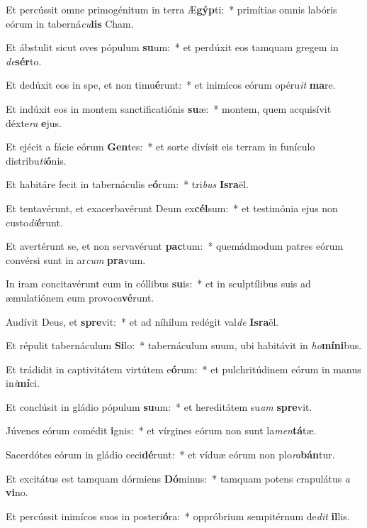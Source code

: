 \item Et percússit omne primogénitum in terra Æ\textbf{gýp}ti:~* primítias omnis labóris eórum in taberná\textit{cu}\textbf{lis} Cham.
\item Et ábstulit sicut oves pópulum \textbf{su}um:~* et perdúxit eos tamquam gregem in \textit{de}\textbf{sér}to.
\item Et dedúxit eos in spe, et non timu\textbf{é}runt:~* et inimícos eórum opéru\textit{it} \textbf{ma}re.
\item Et indúxit eos in montem sanctificatiónis \textbf{su}æ:~* montem, quem acquisívit déxte\textit{ra} \textbf{e}jus.
\item Et ejécit a fácie eórum \textbf{Gen}tes:~* et sorte divísit eis terram in funículo distribu\textit{ti}\textbf{ó}nis.
\item Et habitáre fecit in tabernáculis e\textbf{ó}rum:~* tri\textit{bus} \textbf{Is}\textbf{ra}ël.
\item Et tentavérunt, et exacerbavérunt Deum ex\textbf{cél}sum:~* et testimónia ejus non custo\textit{di}\textbf{é}runt.
\item Et avertérunt se, et non servavérunt \textbf{pac}tum:~* quemádmodum patres eórum convérsi sunt in ar\textit{cum} \textbf{pra}vum.
\item In iram concitavérunt eum in cóllibus \textbf{su}is:~* et in sculptílibus suis ad æmulatiónem eum provo\textit{ca}\textbf{vé}runt.
\item Audívit Deus, et \textbf{spre}vit:~* et ad níhilum redégit val\textit{de} \textbf{Is}\textbf{ra}ël.
\item Et répulit tabernáculum \textbf{Si}lo:~* tabernáculum suum, ubi habitávit in \textit{ho}\textbf{mí}\textbf{ni}bus.
\item Et trádidit in captivitátem virtútem e\textbf{ó}rum:~* et pulchritúdinem eórum in manus in\textit{i}\textbf{mí}ci.
\item Et conclúsit in gládio pópulum \textbf{su}um:~* et hereditátem su\textit{am} \textbf{spre}vit.
\item Júvenes eórum comédit \textbf{i}gnis:~* et vírgines eórum non sunt la\textit{men}\textbf{tá}tæ.
\item Sacerdótes eórum in gládio ceci\textbf{dé}runt:~* et víduæ eórum non plo\textit{ra}\textbf{bán}tur.
\item Et excitátus est tamquam dórmiens \textbf{Dó}minus:~* tamquam potens crapulátus \textit{a} \textbf{vi}no.
\item Et percússit inimícos suos in posteri\textbf{ó}ra:~* oppróbrium sempitérnum de\textit{dit} \textbf{il}lis.
